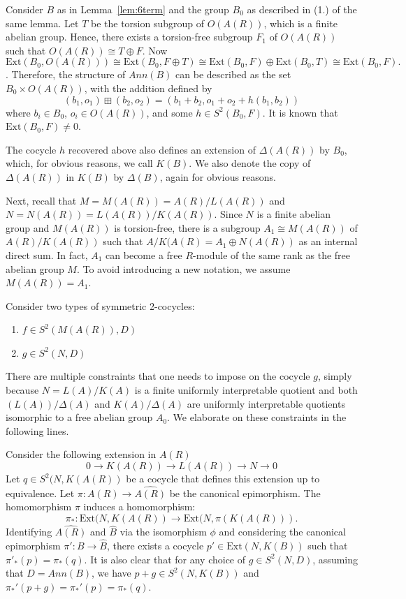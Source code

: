 \documentclass{article}
\theoremstyle{remark}
\def\Ext{\text{Ext}}
\begin{document}
Consider  $B$ as in Lemma~\ref{lem:6term} and the group $B_0$ as described in (1.) of the same lemma. Let $T$ be the torsion subgroup of $O(A(R))$, which is a finite abelian group. Hence, there exists a torsion-free subgroup $F_1$ of $O(A(R))$ such that $O(A(R))\cong T\oplus F$. Now 
$$\Ext(B_0, O(A(R)))\cong \Ext(B_0, F\oplus T)\cong \Ext(B_0, F)\oplus \Ext(B_0, T) \cong \Ext(B_0, F).$$. Therefore, the structure of $Ann(B)$ can be described as the set $B_0\times O(A(R))$, with the addition defined by
$$(b_1,o_1)\boxplus(b_2,o_2)=(b_1+b_2, o_1+o_2+h(b_1,b_2))$$
where $b_i\in B_0$, $o_i \in O(A(R))$, and some $h\in S^2(B_0, F)$. It is known that $\Ext(B_0,F)\neq 0$.

The cocycle $h$ recovered above also defines an extension of $\Delta(A(R))$ by $B_0$, which, for obvious reasons, we call $K(B)$. We also denote the copy of $\Delta(A(R))$ in $K(B)$ by $\Delta(B)$, again for obvious reasons. 

Next, recall that  $M=M(A(R))=A(R)/L(A(R))$ and $N=N(A(R))=L(A(R))/K(A(R))$. Since $N$ is a finite abelian group and $M(A(R))$ is torsion-free, there is a subgroup $A_1\cong M(A(R))$ of $A(R)/K(A(R))$ such that $A/K(A(R) = A_1 \oplus N(A(R))$ as an internal direct sum. In fact, $A_1$ can become a free $R$-module of the same rank as the free abelian group $M$. To avoid introducing a new notation, we assume $M(A(R))=A_1$. 

Consider two types of symmetric 2-cocycles:

\begin{enumerate}
\item $f\in S^2(M(A(R)), D)$
\item $g\in S^2(N, D)$ 
\end{enumerate}
There are multiple constraints that one needs to impose on the cocycle $g$, simply because $N=L(A)/K(A)$ is a finite uniformly interpretable quotient and both $(L(A))/\Delta(A)$ and $K(A)/\Delta(A)$ are uniformly interpretable quotients isomorphic to a free abelian group $A_0$. We elaborate on these constraints in the following lines.

Consider the following extension in $A(R)$ 
$$0\to K(A(R))\to L(A(R)) \to N\to 0$$
 Let $q\in S^2(N, K(A(R))$ be a cocycle that defines this extension up to equivalence. Let $\pi:A(R) \to \widehat{A(R)}$ be the canonical epimorphism. The homomorphism $\pi$ induces a homomorphism: $$\pi_*: \Ext(N, K(A(R)) \to \Ext(N, \pi(K(A(R))).$$ Identifying $\widehat{A(R)}$ and $\widehat{B}$ via the isomorphism $\phi$ and considering the canonical epimorphism $\pi': B \to \widehat{B}$, there exists a cocycle $p'\in \Ext(N, K(B))$ such that $\pi'_*(p)=\pi_*(q)$. It is also clear that for any choice of $g\in S^2(N, D)$, assuming that $D=Ann(B)$, we have $p+g \in S^2(N, K(B))$ and $\pi_*'(p+g)=\pi_*'(p)=\pi_*(q)$. 
\end{document}
